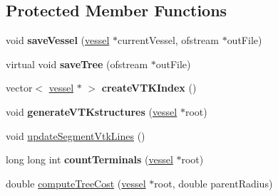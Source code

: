 \subsection*{Protected Member Functions}
\begin{DoxyCompactItemize}
\item 
\mbox{\label{class_abstract_c_c_o_tree_aa3aecb21d45303c21eb81ad98357441c}} 
void {\bfseries save\+Vessel} (\mbox{\hyperlink{structvessel}{vessel}} $\ast$current\+Vessel, ofstream $\ast$out\+File)
\item 
\mbox{\label{class_abstract_c_c_o_tree_aa7bfd25ba293e037efcbdb0e908a89b8}} 
virtual void {\bfseries save\+Tree} (ofstream $\ast$out\+File)
\item 
\mbox{\label{class_abstract_c_c_o_tree_a9ebac469af6253c8ff916d184c7a3ba2}} 
vector$<$ \mbox{\hyperlink{structvessel}{vessel}} $\ast$ $>$ {\bfseries create\+V\+T\+K\+Index} ()
\item 
\mbox{\label{class_abstract_c_c_o_tree_a2310582e162e745b171084e8329e7a8f}} 
void {\bfseries generate\+V\+T\+Kstructures} (\mbox{\hyperlink{structvessel}{vessel}} $\ast$root)
\item 
void \mbox{\hyperlink{class_abstract_c_c_o_tree_a397e54eeaf1d82eee142364f34dd36bb}{update\+Segment\+Vtk\+Lines}} ()
\item 
\mbox{\label{class_abstract_c_c_o_tree_ae3a6d69bc6797f0b65cd815a79645c10}} 
long long int {\bfseries count\+Terminals} (\mbox{\hyperlink{structvessel}{vessel}} $\ast$root)
\item 
double \mbox{\hyperlink{class_abstract_c_c_o_tree_a34b65794f85e0569fe09ac1cf337d70d}{compute\+Tree\+Cost}} (\mbox{\hyperlink{structvessel}{vessel}} $\ast$root, double parent\+Radius)
\end{DoxyCompactItemize}
